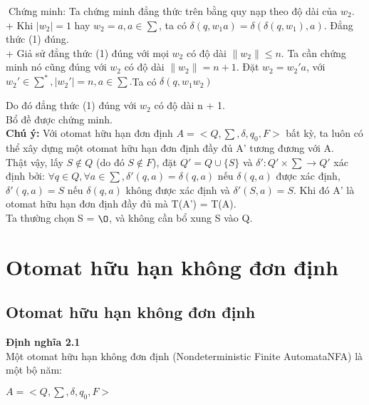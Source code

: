 \begin{flushleft}
Chứng minh: Ta chứng minh đẳng thức trên bằng quy nạp theo độ dài của $w_2$.\\
+ Khi $|w_2| = 1$ hay $w_2 = a, a \in \sum$, ta có $\delta(q, w_1a) = \delta(\delta(q, w_1),a)$. Đẳng thức (1) đúng.\\
+ Giả sử đẳng thức (1) đúng với mọi $w_2$ có độ dài $\|w_2\| \le n$. Ta cần chứng minh nó cũng đúng với $w_2$ có độ dài $\|w_2\| = n + 1$.  Đặt $w_2 = w_2'a$, với $w_2' \in \sum^*, |w_2'| = n, a \in \sum. $Ta có $\delta(q, w_1w_2)$


Do đó đẳng thức (1) đúng với $w_2$ có độ dài n + 1.\\
Bổ đề được chứng minh.\\
\textbf{Chú ý: } Với otomat hữu hạn đơn định $A = <Q, \sum, \delta, q_0, F>$ bất kỳ, ta luôn có thể xây dựng một otomat hữu hạn đơn định đầy đủ A’ tương đương với A. \\
Thật vậy, lấy $S \not \in Q$ (do đó $S \not \in F$), đặt $Q'= Q \cup \{S\}$ và $\delta': Q' \times \sum \to Q'$ xác định bởi: $\forall q \in Q, \forall a \in \sum, \delta'(q, a) = \delta(q, a)$ nếu $\delta(q, a)$ được xác định, $\delta'(q, a) = S$ nếu $\delta(q, a)$ không được xác định và $\delta'(S, a) = S$. Khi đó A' là otomat hữu hạn đơn định đầy đủ mà T(A') = T(A). \\
Ta thường chọn S = $\O$, và không cần bổ xung S vào Q.\\

\section{Otomat hữu hạn không đơn định}
\subsection{Otomat hữu hạn không đơn định}
\textbf{Định nghĩa 2.1}\\
Một otomat hữu hạn không đơn định (Nondeterministic Finite AutomataNFA) là một bộ năm:\\
\end{flushleft}
$A = <Q, \sum, \delta, q_0, F>$\\
